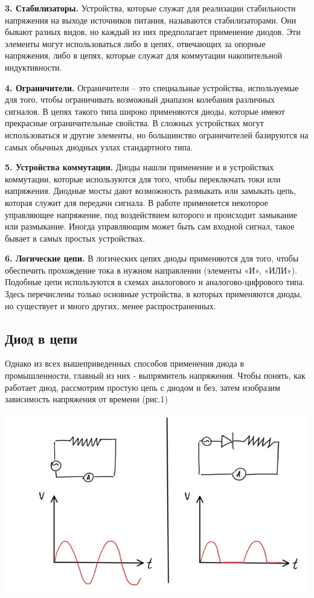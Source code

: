 \documentclass[a4paper]{article}
\begin{document}
\textbf{3. Стабилизаторы.}
Устройства, которые служат для реализации стабильности напряжения на выходе источников питания, называются стабилизаторами. Они бывают разных видов, но каждый из них предполагает применение диодов. Эти элементы могут использоваться либо в цепях, отвечающих за опорные напряжения, либо в цепях, которые служат для коммутации накопительной индуктивности.

\textbf{4. Ограничители.}
Ограничители – это специальные устройства, используемые для того, чтобы ограничивать возможный диапазон колебания различных сигналов. В цепях такого типа широко применяются диоды, которые имеют прекрасные ограничительные свойства. В сложных устройствах могут использоваться и другие элементы, но большинство ограничителей базируются на самых обычных диодных узлах стандартного типа.

\textbf{5. Устройства коммутации.}
Диоды нашли применение и в устройствах коммутации, которые используются для того, чтобы переключать токи или напряжения. Диодные мосты дают возможность размыкать или замыкать цепь, которая служит для передачи сигнала. В работе применяется некоторое управляющее напряжение, под воздействием которого и происходит замыкание или размыкание. Иногда управляющим может быть сам входной сигнал, такое бывает в самых простых устройствах.

\textbf{6. Логические цепи.}
В логических цепях диоды применяются для того, чтобы обеспечить прохождение тока в нужном направлении (элементы «И», «ИЛИ»). Подобные цепи используются в схемах аналогового и аналогово-цифрового типа. Здесь перечислены только основные устройства, в которых применяются диоды, но существует и много других, менее распространенных.

\subsection*{Диод в цепи}

Однако из всех вышеприведенных способов применения диода в промышленности, главный из них - выпрямитель напряжения. Чтобы понять, как работает диод, рассмотрим простую цепь с диодом и без, затем изобразим зависимость напряжения от времени (рис.1)

\begin{center}
    \includegraphics[scale = 0.7]{V(t).jpg}
\end{center}
\end{document}
